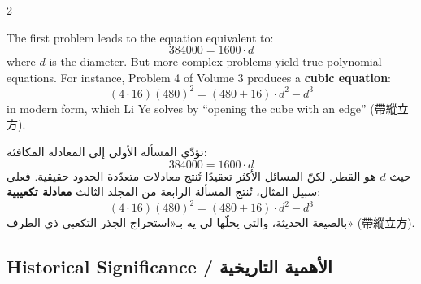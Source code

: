 \documentclass[11pt,a4paper]{article}
\newcommand{\ar}[1]{\arabicfont\beginR #1\endR}
\begin{document}
\begin{paracol}{2}

The first problem leads to the equation equivalent to:
\[
384000 = 1600 \cdot d
\]
where $d$ is the diameter. But more complex problems yield true polynomial equations. For instance, Problem 4 of Volume 3 produces a \textbf{cubic equation}:
\[
(4 \cdot 16)(480)^2 = (480 + 16) \cdot d^2 - d^3
\]
in modern form, which Li Ye solves by ``opening the cube with an edge'' (帶縱立方).

\switchcolumn

\ar{تؤدّي المسألة الأولى إلى المعادلة المكافئة:}
\[
384000 = 1600 \cdot d
\]
\ar{حيث $d$ هو القطر. لكنّ المسائل الأكثر تعقيدًا تُنتج معادلات متعدّدة الحدود حقيقية. فعلى سبيل المثال، تُنتج المسألة الرابعة من المجلد الثالث \textbf{معادلة تكعيبية}:}
\[
(4 \cdot 16)(480)^2 = (480 + 16) \cdot d^2 - d^3
\]
\ar{بالصيغة الحديثة، والتي يحلّها لي يه بـ«استخراج الجذر التكعبي ذي الطرف» (帶縱立方).}

\end{paracol}

\vspace{0.5cm}

\subsection{Historical Significance / \ar{الأهمية التاريخية}}
\end{document}
